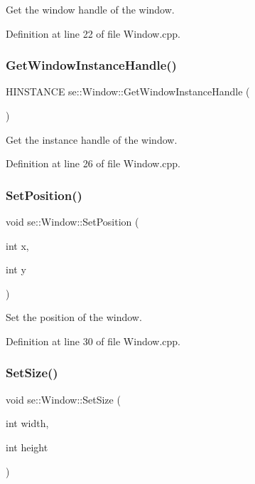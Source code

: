 Get the window handle of the window. 

Definition at line 22 of file Window.\+cpp.

\mbox{\label{classse_1_1_window_a7ae4b774d8f47d6abb0462e2240e8cae}} 
\subsubsection{\texorpdfstring{Get\+Window\+Instance\+Handle()}{GetWindowInstanceHandle()}}
{\footnotesize\ttfamily H\+I\+N\+S\+T\+A\+N\+CE se\+::\+Window\+::\+Get\+Window\+Instance\+Handle (\begin{DoxyParamCaption}{ }\end{DoxyParamCaption})}

Get the instance handle of the window. 

Definition at line 26 of file Window.\+cpp.

\mbox{\label{classse_1_1_window_ad2fc9ceb2c543762bbc863fe6df637a1}} 
\subsubsection{\texorpdfstring{Set\+Position()}{SetPosition()}}
{\footnotesize\ttfamily void se\+::\+Window\+::\+Set\+Position (\begin{DoxyParamCaption}\item[{int}]{x,  }\item[{int}]{y }\end{DoxyParamCaption})}

Set the position of the window. 

Definition at line 30 of file Window.\+cpp.

\mbox{\label{classse_1_1_window_a7c66652dccf4764cfa6e4af6fab684b8}} 
\subsubsection{\texorpdfstring{Set\+Size()}{SetSize()}}
{\footnotesize\ttfamily void se\+::\+Window\+::\+Set\+Size (\begin{DoxyParamCaption}\item[{int}]{width,  }\item[{int}]{height }\end{DoxyParamCaption})}

